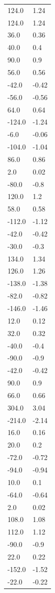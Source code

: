 \begin{longtable}{ll}
124.0 & 1.24 \\
124.0 & 1.24 \\
36.0 & 0.36 \\
40.0 & 0.4 \\
90.0 & 0.9 \\
56.0 & 0.56 \\
-42.0 & -0.42 \\
-56.0 & -0.56 \\
64.0 & 0.64 \\
-124.0 & -1.24 \\
-6.0 & -0.06 \\
-104.0 & -1.04 \\
86.0 & 0.86 \\
2.0 & 0.02 \\
-80.0 & -0.8 \\
120.0 & 1.2 \\
58.0 & 0.58 \\
-112.0 & -1.12 \\
-42.0 & -0.42 \\
-30.0 & -0.3 \\
134.0 & 1.34 \\
126.0 & 1.26 \\
-138.0 & -1.38 \\
-82.0 & -0.82 \\
-146.0 & -1.46 \\
12.0 & 0.12 \\
32.0 & 0.32 \\
-40.0 & -0.4 \\
-90.0 & -0.9 \\
-42.0 & -0.42 \\
90.0 & 0.9 \\
66.0 & 0.66 \\
304.0 & 3.04 \\
-214.0 & -2.14 \\
16.0 & 0.16 \\
20.0 & 0.2 \\
-72.0 & -0.72 \\
-94.0 & -0.94 \\
10.0 & 0.1 \\
-64.0 & -0.64 \\
2.0 & 0.02 \\
108.0 & 1.08 \\
112.0 & 1.12 \\
-90.0 & -0.9 \\
22.0 & 0.22 \\
-152.0 & -1.52 \\
-22.0 & -0.22 \\

\end{longtable}
